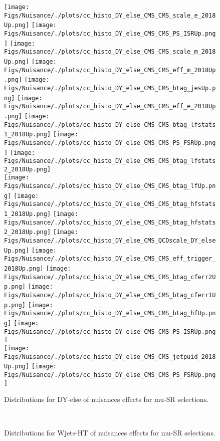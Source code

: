 \begin{figure*}[htbp]  
\centering 
\texttt{[image: Figs/Nuisance/./plots/cc\_histo\_DY\_else\_CMS\_CMS\_scale\_e\_2018Up.png]}
\texttt{[image: Figs/Nuisance/./plots/cc\_histo\_DY\_else\_CMS\_CMS\_PS\_ISRUp.png]}
\texttt{[image: Figs/Nuisance/./plots/cc\_histo\_DY\_else\_CMS\_CMS\_scale\_m\_2018Up.png]}
\texttt{[image: Figs/Nuisance/./plots/cc\_histo\_DY\_else\_CMS\_CMS\_eff\_m\_2018Up.png]}
\texttt{[image: Figs/Nuisance/./plots/cc\_histo\_DY\_else\_CMS\_CMS\_btag\_jesUp.png]}
\texttt{[image: Figs/Nuisance/./plots/cc\_histo\_DY\_else\_CMS\_CMS\_eff\_e\_2018Up.png]}
\texttt{[image: Figs/Nuisance/./plots/cc\_histo\_DY\_else\_CMS\_CMS\_btag\_lfstats1\_2018Up.png]}
\texttt{[image: Figs/Nuisance/./plots/cc\_histo\_DY\_else\_CMS\_CMS\_PS\_FSRUp.png]}
\texttt{[image: Figs/Nuisance/./plots/cc\_histo\_DY\_else\_CMS\_CMS\_btag\_lfstats2\_2018Up.png]}\\
\texttt{[image: Figs/Nuisance/./plots/cc\_histo\_DY\_else\_CMS\_CMS\_btag\_lfUp.png]}
\texttt{[image: Figs/Nuisance/./plots/cc\_histo\_DY\_else\_CMS\_CMS\_btag\_hfstats1\_2018Up.png]}
\texttt{[image: Figs/Nuisance/./plots/cc\_histo\_DY\_else\_CMS\_CMS\_btag\_hfstats2\_2018Up.png]}
\texttt{[image: Figs/Nuisance/./plots/cc\_histo\_DY\_else\_CMS\_QCDscale\_DY\_elseUp.png]}
\texttt{[image: Figs/Nuisance/./plots/cc\_histo\_DY\_else\_CMS\_CMS\_eff\_trigger\_2018Up.png]}
\texttt{[image: Figs/Nuisance/./plots/cc\_histo\_DY\_else\_CMS\_CMS\_btag\_cferr2Up.png]}
\texttt{[image: Figs/Nuisance/./plots/cc\_histo\_DY\_else\_CMS\_CMS\_btag\_cferr1Up.png]}
\texttt{[image: Figs/Nuisance/./plots/cc\_histo\_DY\_else\_CMS\_CMS\_btag\_hfUp.png]}
\texttt{[image: Figs/Nuisance/./plots/cc\_histo\_DY\_else\_CMS\_CMS\_PS\_ISRUp.png]}\\
\texttt{[image: Figs/Nuisance/./plots/cc\_histo\_DY\_else\_CMS\_CMS\_jetpuid\_2018Up.png]}
\texttt{[image: Figs/Nuisance/./plots/cc\_histo\_DY\_else\_CMS\_CMS\_PS\_FSRUp.png]}
\\ 
\caption{ 
   Distributions for DY-else of nuisances effects for mu-SR selections.
} 
\label{fig:DY_else_mu_SR} 
\end{figure*} 




\begin{figure*}[htbp]  
\centering 
\\ 
\caption{ 
   Distributions for Wjets-HT of nuisances effects for mu-SR selections.
} 
\label{fig:Wjets_HT_mu_SR} 
\end{figure*} 




